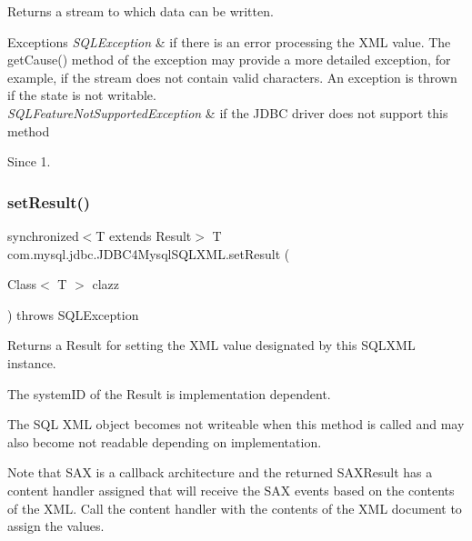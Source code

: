 \begin{DoxyReturn}{Returns}
a stream to which data can be written. 
\end{DoxyReturn}

\begin{DoxyExceptions}{Exceptions}
{\em S\+Q\+L\+Exception} & if there is an error processing the X\+ML value. The get\+Cause() method of the exception may provide a more detailed exception, for example, if the stream does not contain valid characters. An exception is thrown if the state is not writable. \\
\hline
{\em S\+Q\+L\+Feature\+Not\+Supported\+Exception} & if the J\+D\+BC driver does not support this method \\
\hline
\end{DoxyExceptions}
\begin{DoxySince}{Since}
1. 
\end{DoxySince}
\mbox{\label{classcom_1_1mysql_1_1jdbc_1_1_j_d_b_c4_mysql_s_q_l_x_m_l_af9a1ac7df0bf58011e4e8ab1e2ed1348}} 
\subsubsection{\texorpdfstring{set\+Result()}{setResult()}}
{\footnotesize\ttfamily synchronized$<$T extends Result$>$ T com.\+mysql.\+jdbc.\+J\+D\+B\+C4\+Mysql\+S\+Q\+L\+X\+M\+L.\+set\+Result (\begin{DoxyParamCaption}\item[{Class$<$ T $>$}]{clazz }\end{DoxyParamCaption}) throws S\+Q\+L\+Exception}

Returns a Result for setting the X\+ML value designated by this S\+Q\+L\+X\+ML instance. 

The system\+ID of the Result is implementation dependent. 

The S\+QL X\+ML object becomes not writeable when this method is called and may also become not readable depending on implementation. 

Note that S\+AX is a callback architecture and the returned S\+A\+X\+Result has a content handler assigned that will receive the S\+AX events based on the contents of the X\+ML. Call the content handler with the contents of the X\+ML document to assign the values.


